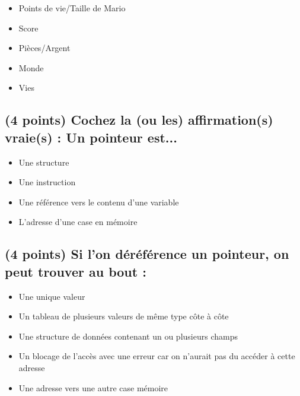\documentclass[11pt,a4paper]{article}
\begin{document}
\begin{itemize}
  \item[\CaseCoche] Points de vie/Taille de Mario \\
  \item[\CaseCoche] Score \\
  \item[\CaseCoche] Pièces/Argent \\
  \item[\CaseCoche] Monde \\
  \item[\CaseCoche] Vies \\
\end{itemize}


\bigskip
\vspace*{1cm}


\subsection{(4 points) Cochez la (ou les) affirmation(s) vraie(s) : \og Un pointeur est... \fg }

\begin{itemize}
  \item[\CaseCoche] Une structure \\
  \item[\CaseCoche] Une instruction \\
  \item[\CaseCoche] Une référence vers le contenu d'une variable \\
  \item[\CaseCoche] L'adresse d'une case en mémoire \\
\end{itemize}


\vfillLast

\newpage

\vfillFirst


\subsection{(4 points) Si l'on déréférence un pointeur, on peut trouver au bout : }

\begin{itemize}
  \item[\CaseCoche] Une unique valeur \\
  \item[\CaseCoche] Un tableau de plusieurs valeurs de même type côte à côte \\
  \item[\CaseCoche] Une structure de données contenant un ou plusieurs champs \\
  \item[\CaseCoche] Un blocage de l'accès avec une erreur car on n'aurait pas du accéder à cette adresse \\
  \item[\CaseCoche] Une adresse vers une autre case mémoire \\
\end{itemize}
\end{document}
